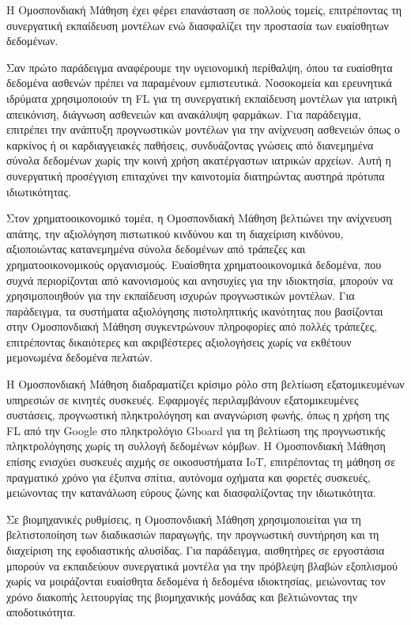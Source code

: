 Η Ομοσπονδιακή Μάθηση έχει φέρει επανάσταση σε πολλούς τομείς, επιτρέποντας τη συνεργατική εκπαίδευση μοντέλων ενώ διασφαλίζει την προστασία των ευαίσθητων δεδομένων.

Σαν πρώτο παράδειγμα αναφέρουμε την υγειονομική περίθαλψη, όπου τα ευαίσθητα δεδομένα ασθενών πρέπει να παραμένουν εμπιστευτικά. Νοσοκομεία και ερευνητικά ιδρύματα χρησιμοποιούν τη FL για τη συνεργατική εκπαίδευση μοντέλων για ιατρική απεικόνιση, διάγνωση ασθενειών και ανακάλυψη φαρμάκων. Για παράδειγμα, επιτρέπει την ανάπτυξη προγνωστικών μοντέλων για την ανίχνευση ασθενειών όπως ο καρκίνος ή οι καρδιαγγειακές παθήσεις, συνδυάζοντας γνώσεις από διανεμημένα σύνολα δεδομένων χωρίς την κοινή χρήση ακατέργαστων ιατρικών αρχείων. Αυτή η συνεργατική προσέγγιση επιταχύνει την καινοτομία διατηρώντας αυστηρά πρότυπα ιδιωτικότητας.

Στον χρηματοοικονομικό τομέα, η Ομοσπονδιακή Μάθηση βελτιώνει την ανίχνευση απάτης, την αξιολόγηση πιστωτικού κινδύνου και τη διαχείριση κινδύνου, αξιοποιώντας κατανεμημένα σύνολα δεδομένων από τράπεζες και χρηματοοικονομικούς οργανισμούς. Ευαίσθητα χρηματοοικονομικά δεδομένα, που συχνά περιορίζονται από κανονισμούς και ανησυχίες για την ιδιοκτησία, μπορούν να χρησιμοποιηθούν για την εκπαίδευση ισχυρών προγνωστικών μοντέλων. Για παράδειγμα, τα συστήματα αξιολόγησης πιστοληπτικής ικανότητας που βασίζονται στην Ομοσπονδιακή Μάθηση συγκεντρώνουν πληροφορίες από πολλές τράπεζες, επιτρέποντας δικαιότερες και ακριβέστερες αξιολογήσεις χωρίς να εκθέτουν μεμονωμένα δεδομένα πελατών.

Η Ομοσπονδιακή Μάθηση διαδραματίζει κρίσιμο ρόλο στη βελτίωση εξατομικευμένων υπηρεσιών σε κινητές συσκευές. Εφαρμογές περιλαμβάνουν εξατομικευμένες συστάσεις, προγνωστική πληκτρολόγηση και αναγνώριση φωνής, όπως η χρήση της FL από την Google στο πληκτρολόγιο Gboard για τη βελτίωση της προγνωστικής πληκτρολόγησης χωρίς τη συλλογή δεδομένων κόμβων. Η Ομοσπονδιακή Μάθηση επίσης ενισχύει συσκευές αιχμής σε οικοσυστήματα IoT, επιτρέποντας τη μάθηση σε πραγματικό χρόνο για έξυπνα σπίτια, αυτόνομα οχήματα και φορετές συσκευές, μειώνοντας την κατανάλωση εύρους ζώνης και διασφαλίζοντας την ιδιωτικότητα.

Σε βιομηχανικές ρυθμίσεις, η Ομοσπονδιακή Μάθηση χρησιμοποιείται για τη βελτιστοποίηση των διαδικασιών παραγωγής, την προγνωστική συντήρηση και τη διαχείριση της εφοδιαστικής αλυσίδας. Για παράδειγμα, αισθητήρες σε εργοστάσια μπορούν να εκπαιδεύουν συνεργατικά μοντέλα για την πρόβλεψη βλαβών εξοπλισμού χωρίς να μοιράζονται ευαίσθητα δεδομένα ή δεδομένα ιδιοκτησίας, μειώνοντας τον χρόνο διακοπής λειτουργίας της βιομηχανικής μονάδας και βελτιώνοντας την αποδοτικότητα.

